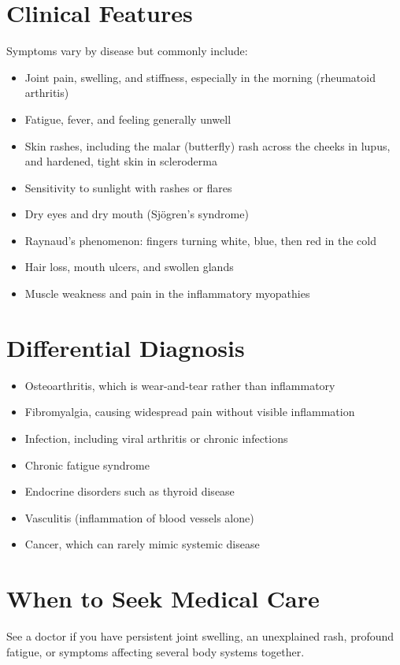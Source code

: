 \section*{Clinical Features}
Symptoms vary by disease but commonly include:
\begin{itemize}
    \item Joint pain, swelling, and stiffness, especially in the morning (rheumatoid arthritis)
    \item Fatigue, fever, and feeling generally unwell
    \item Skin rashes, including the malar (butterfly) rash across the cheeks in lupus, and hardened, tight skin in scleroderma
    \item Sensitivity to sunlight with rashes or flares
    \item Dry eyes and dry mouth (Sjögren's syndrome)
    \item Raynaud's phenomenon: fingers turning white, blue, then red in the cold
    \item Hair loss, mouth ulcers, and swollen glands
    \item Muscle weakness and pain in the inflammatory myopathies
\end{itemize}

\section*{Differential Diagnosis}
\begin{itemize}
    \item Osteoarthritis, which is wear-and-tear rather than inflammatory
    \item Fibromyalgia, causing widespread pain without visible inflammation
    \item Infection, including viral arthritis or chronic infections
    \item Chronic fatigue syndrome
    \item Endocrine disorders such as thyroid disease
    \item Vasculitis (inflammation of blood vessels alone)
    \item Cancer, which can rarely mimic systemic disease
\end{itemize}

\section*{When to Seek Medical Care}
See a doctor if you have persistent joint swelling, an unexplained rash, profound fatigue, or symptoms affecting several body systems together.

